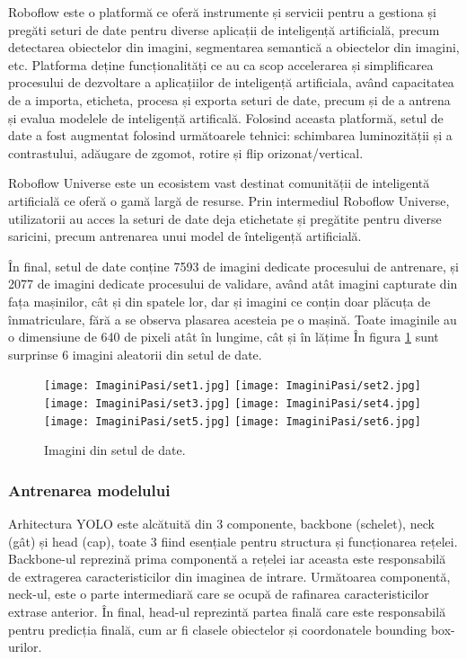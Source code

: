 \documentclass[12pt]{article}
\begin{document}
Roboflow este o platform\u{a} ce ofer\u{a} instrumente și servicii pentru a gestiona și preg\u{a}ti seturi de date pentru diverse aplicații de inteligenț\u{a} artificial\u{a}, precum detectarea obiectelor din imagini, segmentarea semantic\u{a} a obiectelor din imagini, etc. Platforma deține funcționalit\u{a}ți ce au ca scop accelerarea și simplificarea procesului de dezvoltare a aplicațiilor de inteligenț\u{a} artificiala, av\^{a}nd capacitatea de a importa, eticheta, procesa și exporta seturi de date, precum și de a antrena și evalua modelele de inteligenț\u{a} artifical\u{a}. Folosind aceasta platform\u{a}, setul de date a fost augmentat folosind urm\u{a}toarele tehnici: schimbarea luminozit\u{a}ții și a contrastului, ad\u{a}ugare de zgomot, rotire și flip orizonat/vertical.

Roboflow Universe este un ecosistem vast destinat comunit\u{a}ții de inteligent\u{a} artificial\u{a} ce ofer\u{a} o gam\u{a} larg\u{a} de resurse. Prin intermediul Roboflow Universe, utilizatorii au acces la seturi de date deja etichetate și preg\u{a}tite pentru diverse saricini, precum antrenarea unui model de \^{i}nteligenț\u{a} artificial\u{a}.

\^{I}n final, setul de date conține 7593 de imagini dedicate procesului de antrenare, și 2077 de imagini dedicate procesului de validare, av\^{a}nd at\^{a}t imagini capturate din fața mașinilor, c\^{a}t și din spatele lor, dar și imagini ce conțin doar pl\u{a}cuța de \^{i}nmatriculare, f\u{a}r\u{a} a se observa plasarea acesteia pe o mașin\u{a}. Toate imaginile au o dimensiune de 640 de pixeli at\^{a}t \^{i}n lungime, c\^{a}t și \^{i}n l\u{a}țime \^{I}n figura \ref{fig:imagini_set_date} sunt surprinse 6 imagini aleatorii din setul de date.

\begin{figure}[H]
  \centering
  \texttt{[image: ImaginiPasi/set1.jpg]}\hfill
  \texttt{[image: ImaginiPasi/set2.jpg]}\hfill
    \texttt{[image: ImaginiPasi/set3.jpg]}
    \texttt{[image: ImaginiPasi/set4.jpg]}\hfill
  \texttt{[image: ImaginiPasi/set5.jpg]}\hfill
    \texttt{[image: ImaginiPasi/set6.jpg]}
  \caption{Imagini din setul de date.}
  \label{fig:imagini_set_date}
\end{figure}

\subsubsection{Antrenarea modelului}

Arhitectura YOLO este alc\u{a}tuit\u{a} din 3 componente, backbone (schelet), neck (g\^{a}t) și head (cap), toate 3 fiind esențiale pentru structura și funcționarea rețelei. Backbone-ul reprezin\u{a} prima component\u{a} a rețelei iar aceasta este responsabil\u{a} de extragerea caracteristicilor din imaginea de intrare. Urm\u{a}toarea component\u{a}, neck-ul, este o parte intermediar\u{a} care se ocup\u{a} de rafinarea caracteristicilor extrase anterior. \^{I}n final, head-ul reprezint\u{a} partea final\u{a} care este responsabil\u{a} pentru predicția final\u{a}, cum ar fi clasele obiectelor și coordonatele bounding box-urilor.
\end{document}
